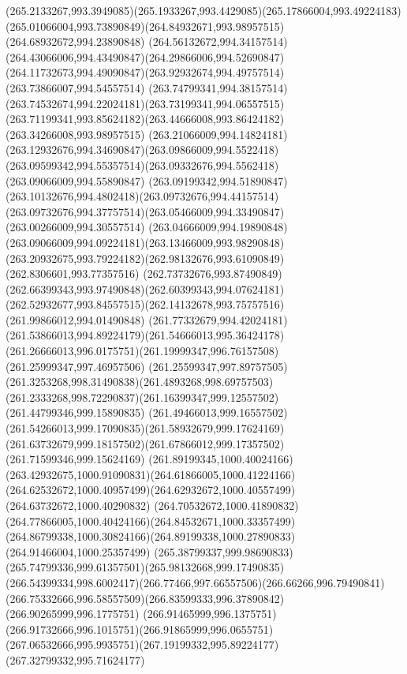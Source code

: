{{		\curveto(265.2133267,993.3949085)(265.1933267,993.4429085)(265.17866004,993.49224183)
		\curveto(265.01066004,993.73890849)(264.84932671,993.98957515)(264.68932672,994.23890848)
		\curveto(264.56132672,994.34157514)(264.43066006,994.43490847)(264.29866006,994.52690847)
		\curveto(264.11732673,994.49090847)(263.92932674,994.49757514)(263.73866007,994.54557514)
		\curveto(263.74799341,994.38157514)(263.74532674,994.22024181)(263.73199341,994.06557515)
		\curveto(263.71199341,993.85624182)(263.44666008,993.86424182)(263.34266008,993.98957515)
		\curveto(263.21066009,994.14824181)(263.12932676,994.34690847)(263.09866009,994.5522418)
		\curveto(263.09599342,994.55357514)(263.09332676,994.5562418)(263.09066009,994.55890847)
		\curveto(263.09199342,994.51890847)(263.10132676,994.4802418)(263.09732676,994.44157514)
		\curveto(263.09732676,994.37757514)(263.05466009,994.33490847)(263.00266009,994.30557514)
		\curveto(263.04666009,994.19890848)(263.09066009,994.09224181)(263.13466009,993.98290848)
		\curveto(263.20932675,993.79224182)(262.98132676,993.61090849)(262.8306601,993.77357516)
		\curveto(262.73732676,993.87490849)(262.66399343,993.97490848)(262.60399343,994.07624181)
		\curveto(262.52932677,993.84557515)(262.14132678,993.75757516)(261.99866012,994.01490848)
		\curveto(261.77332679,994.42024181)(261.53866013,994.89224179)(261.54666013,995.36424178)
		\curveto(261.26666013,996.0175751)(261.19999347,996.76157508)(261.25999347,997.46957506)
		\curveto(261.25599347,997.89757505)(261.3253268,998.31490838)(261.4893268,998.69757503)
		\curveto(261.2333268,998.72290837)(261.16399347,999.12557502)(261.44799346,999.15890835)
		\curveto(261.49466013,999.16557502)(261.54266013,999.17090835)(261.58932679,999.17624169)
		\curveto(261.63732679,999.18157502)(261.67866012,999.17357502)(261.71599346,999.15624169)
		\curveto(261.89199345,1000.40024166)(263.42932675,1000.91090831)(264.61866005,1000.41224166)
		\curveto(264.62532672,1000.40957499)(264.62932672,1000.40557499)(264.63732672,1000.40290832)
		\curveto(264.70532672,1000.41890832)(264.77866005,1000.40424166)(264.84532671,1000.33357499)
		\curveto(264.86799338,1000.30824166)(264.89199338,1000.27890833)(264.91466004,1000.25357499)
		\curveto(265.38799337,999.98690833)(265.74799336,999.61357501)(265.98132668,999.17490835)
		\curveto(266.54399334,998.6002417)(266.77466,997.66557506)(266.66266,996.79490841)
		\curveto(266.75332666,996.58557509)(266.83599333,996.37890842)(266.90265999,996.1775751)
		\curveto(266.91465999,996.1375751)(266.91732666,996.1015751)(266.91865999,996.0655751)
		\curveto(267.06532666,995.9935751)(267.19199332,995.89224177)(267.32799332,995.71624177)
}}

